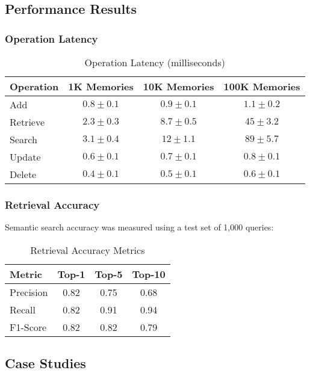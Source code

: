 \documentclass[journal]{IEEEtran}
\begin{document}
\subsection{Performance Results}

\subsubsection{Operation Latency}

\begin{table}[h]
\centering
\caption{Operation Latency (milliseconds)}
\label{tab:latency}
\begin{tabular}{|l|c|c|c|}
\hline
Operation & 1K Memories & 10K Memories & 100K Memories \\
\hline
Add & $0.8 \pm 0.1$ & $0.9 \pm 0.1$ & $1.1 \pm 0.2$ \\
Retrieve & $2.3 \pm 0.3$ & $8.7 \pm 0.5$ & $45 \pm 3.2$ \\
Search & $3.1 \pm 0.4$ & $12 \pm 1.1$ & $89 \pm 5.7$ \\
Update & $0.6 \pm 0.1$ & $0.7 \pm 0.1$ & $0.8 \pm 0.1$ \\
Delete & $0.4 \pm 0.1$ & $0.5 \pm 0.1$ & $0.6 \pm 0.1$ \\
\hline
\end{tabular}
\end{table}

\subsubsection{Retrieval Accuracy}

Semantic search accuracy was measured using a test set of 1,000 queries:

\begin{table}[h]
\centering
\caption{Retrieval Accuracy Metrics}
\label{tab:accuracy}
\begin{tabular}{|l|c|c|c|}
\hline
Metric & Top-1 & Top-5 & Top-10 \\
\hline
Precision & 0.82 & 0.75 & 0.68 \\
Recall & 0.82 & 0.91 & 0.94 \\
F1-Score & 0.82 & 0.82 & 0.79 \\
\hline
\end{tabular}
\end{table}

\subsection{Case Studies}
\end{document}

